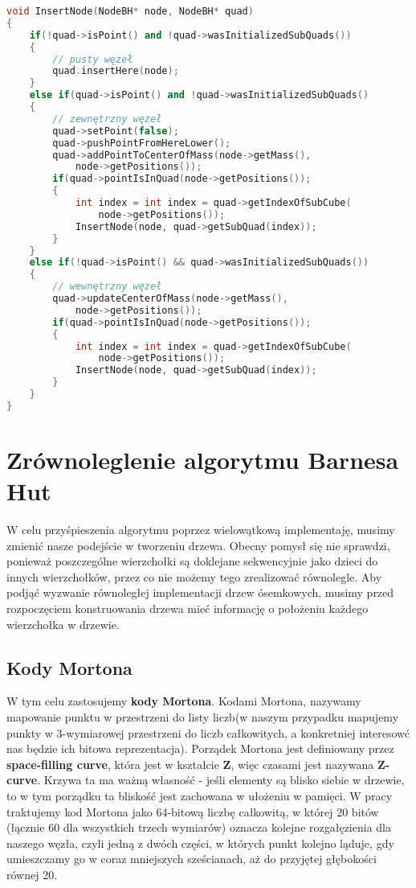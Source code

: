 \documentclass[14pt,twoside,a4paper]{article}
\theoremstyle{definition}
\begin{document}
\bigskip
{}
\begin{lstlisting}[language=C++, frame=single, framerule=2pt, caption=Wstawianie pojedynczego węzła do drzewa]
void InsertNode(NodeBH* node, NodeBH* quad) 
{
    if(!quad->isPoint() and !quad->wasInitializedSubQuads()) 
    {
        // pusty węzeł
        quad.insertHere(node);
    }
    else if(quad->isPoint() and !quad->wasInitializedSubQuads()
    {
        // zewnętrzny węzeł
        quad->setPoint(false);
        quad->pushPointFromHereLower();
        quad->addPointToCenterOfMass(node->getMass(), 
            node->getPositions());
        if(quad->pointIsInQuad(node->getPositions());
        {
            int index = int index = quad->getIndexOfSubCube(
                node->getPositions());
            InsertNode(node, quad->getSubQuad(index));
        }
    }
    else if(!quad->isPoint() && quad->wasInitializedSubQuads())
    {
        // wewnętrzny węzeł
        quad->updateCenterOfMass(node->getMass(), 
            node->getPositions());
        if(quad->pointIsInQuad(node->getPositions());
        {
            int index = int index = quad->getIndexOfSubCube(
                node->getPositions());
            InsertNode(node, quad->getSubQuad(index));
        }
    }
}
\end{lstlisting}

\section{\LARGE Zrównoleglenie algorytmu Barnesa Hut}

W celu przyśpieszenia algorytmu poprzez wielowątkową implementaję, musimy zmienić nasze podejście w tworzeniu drzewa. Obecny pomysł się nie sprawdzi, ponieważ poszczególne wierzchołki są doklejane sekwencyjnie jako dzieci do innych wierzchołków, przez co nie możemy tego zrealizować równolegle.
Aby podjąć wyzwanie równoległej implementacji drzew ósemkowych, musimy przed rozpoczęciem konstruowania drzewa mieć informację o położeniu każdego wierzchołka w drzewie.

\subsection{\Large Kody Mortona}
W tym celu zastosujemy \textbf{kody Mortona}.
Kodami Mortona, nazywamy mapowanie punktu w przestrzeni do listy liczb(w naszym przypadku mapujemy punkty w 3-wymiarowej przestrzeni do liczb całkowitych, a konkretniej interesowć nas będzie ich bitowa reprezentacja).
Porządek Mortona jest definiowany przez \textbf{space-filling curve}, która jest w kształcie \textbf{Z}, więc czasami jest nazywana \textbf{Z-curve}. Krzywa ta ma ważną własność - jeśli elementy są blisko siebie w drzewie, to w tym porządku ta bliskość jest zachowana w ułożeniu w pamięci. W pracy traktujemy kod Mortona jako 64-bitową liczbę całkowitą, w której 20 bitów (łącznie 60 dla wszystkich trzech wymiarów) oznacza kolejne rozgałęzienia dla naszego węzła, czyli jedną z dwóch części, w których punkt kolejno ląduje, gdy umieszczamy go w coraz mniejszych sześcianach, aż do przyjętej głębokości równej 20.
\end{document}
